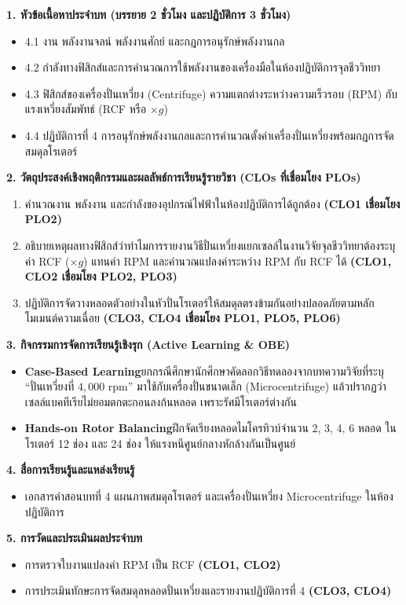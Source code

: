 \cleardoublepage
{}
\begin{planbox}
\noindent\textbf{1. หัวข้อเนื้อหาประจำบท (บรรยาย 2 ชั่วโมง และปฏิบัติการ 3 ชั่วโมง)}
\begin{itemize}
    \item 4.1 งาน พลังงานจลน์ พลังงานศักย์ และกฎการอนุรักษ์พลังงานกล
    \item 4.2 กำลังทางฟิสิกส์และการคำนวณการใช้พลังงานของเครื่องมือในห้องปฏิบัติการจุลชีววิทยา
    \item 4.3 ฟิสิกส์ของเครื่องปั่นเหวี่ยง (Centrifuge) ความแตกต่างระหว่างความเร็วรอบ (RPM) กับแรงเหวี่ยงสัมพัทธ์ (RCF หรือ $\times g$)
    \item 4.4 ปฏิบัติการที่ 4 การอนุรักษ์พลังงานกลและการคำนวณตั้งค่าเครื่องปั่นเหวี่ยงพร้อมกฎการจัดสมดุลโรเตอร์
\end{itemize}

\noindent\textbf{2. วัตถุประสงค์เชิงพฤติกรรมและผลลัพธ์การเรียนรู้รายวิชา (CLOs ที่เชื่อมโยง PLOs)}
\begin{enumerate}
    \item คำนวณงาน พลังงาน และกำลังของอุปกรณ์ไฟฟ้าในห้องปฏิบัติการได้ถูกต้อง \textbf{(CLO1 เชื่อมโยง PLO2)}
    \item อธิบายเหตุผลทางฟิสิกส์ว่าทำไมการรายงานวิธีปั่นเหวี่ยงแยกเซลล์ในงานวิจัยจุลชีววิทยาต้องระบุค่า RCF ($\times g$) แทนค่า RPM และคำนวณแปลงค่าระหว่าง RPM กับ RCF ได้ \textbf{(CLO1, CLO2 เชื่อมโยง PLO2, PLO3)}
    \item ปฏิบัติการจัดวางหลอดตัวอย่างในหัวปั่นโรเตอร์ให้สมดุลตรงข้ามกันอย่างปลอดภัยตามหลักโมเมนต์ความเฉื่อย \textbf{(CLO3, CLO4 เชื่อมโยง PLO1, PLO5, PLO6)}
\end{enumerate}

\noindent\textbf{3. กิจกรรมการจัดการเรียนรู้เชิงรุก (Active Learning \& OBE)}
\begin{itemize}
    \item \textbf{Case-Based Learning}\quad ยกกรณีศึกษานักศึกษาคัดลอกวิธีทดลองจากบทความวิจัยที่ระบุ ``ปั่นเหวี่ยงที่ $4{,}000\text{ rpm}$'' มาใช้กับเครื่องปั่นขนาดเล็ก (Microcentrifuge) แล้วปรากฏว่าเซลล์แบคทีเรียไม่ยอมตกตะกอนลงก้นหลอด เพราะรัศมีโรเตอร์ต่างกัน
    \item \textbf{Hands-on Rotor Balancing}\quad ฝึกจัดเรียงหลอดไมโครทิวบ์จำนวน 2, 3, 4, 6 หลอด ในโรเตอร์ 12 ช่อง และ 24 ช่อง ให้แรงหนีศูนย์กลางหักล้างกันเป็นศูนย์
\end{itemize}

\noindent\textbf{4. สื่อการเรียนรู้และแหล่งเรียนรู้}
\begin{itemize}
    \item เอกสารคำสอนบทที่ 4 แผนภาพสมดุลโรเตอร์ และเครื่องปั่นเหวี่ยง Microcentrifuge ในห้องปฏิบัติการ
\end{itemize}

\noindent\textbf{5. การวัดและประเมินผลประจำบท}
\begin{itemize}
    \item การตรวจใบงานแปลงค่า RPM เป็น RCF \textbf{(CLO1, CLO2)}
    \item การประเมินทักษะการจัดสมดุลหลอดปั่นเหวี่ยงและรายงานปฏิบัติการที่ 4 \textbf{(CLO3, CLO4)}
\end{itemize}
\end{planbox}

